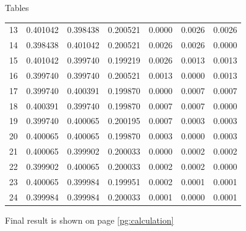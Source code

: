 \documentclass[10pt]{beamer}
\begin{document}
\begin{frame}[fragile]{Tables}
\begin{table}
\begin{center}
\begin{tabular}{c c c c c c c}
13 & 0.401042 & 0.398438 & 0.200521 & 0.0000 & 0.0026 & 0.0026\\
14 & 0.398438 & 0.401042 & 0.200521 & 0.0026 & 0.0026 & 0.0000\\
15 & 0.401042 & 0.399740 & 0.199219 & 0.0026 & 0.0013 & 0.0013\\
16 & 0.399740 & 0.399740 & 0.200521 & 0.0013 & 0.0000 & 0.0013\\
17 & 0.399740 & 0.400391 & 0.199870 & 0.0000 & 0.0007 & 0.0007\\
18 & 0.400391 & 0.399740 & 0.199870 & 0.0007 & 0.0007 & 0.0000\\
19 & 0.399740 & 0.400065 & 0.200195 & 0.0007 & 0.0003 & 0.0003\\
20 & 0.400065 & 0.400065 & 0.199870 & 0.0003 & 0.0000 & 0.0003\\
21 & 0.400065 & 0.399902 & 0.200033 & 0.0000 & 0.0002 & 0.0002\\
22 & 0.399902 & 0.400065 & 0.200033 & 0.0002 & 0.0002 & 0.0000\\
23 & 0.400065 & 0.399984 & 0.199951 & 0.0002 & 0.0001 & 0.0001\\
24 & 0.399984 & 0.399984 & 0.200033 & 0.0001 & 0.0000 & 0.0001\\
\bottomrule
\end{tabular}
\end{center}
\end{table}
\begin{center}
	\tiny
    \vspace{-5mm}
    Final result is shown on page \ref{pg:calculation}
\end{center}
\end{frame}
\end{document}
